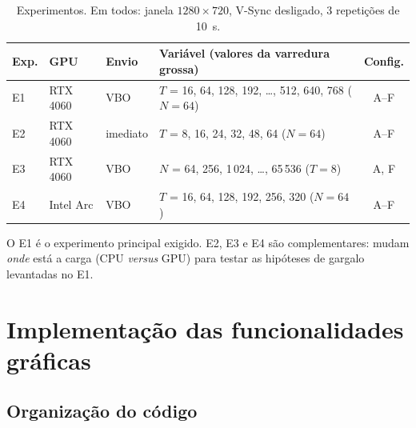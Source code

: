 \documentclass[12pt,a4paper]{article}
\begin{document}
\begin{table}[H]
\centering
\caption{Experimentos. Em todos: janela $1280\times720$, V-Sync desligado, 3 repetições de 10~s.}
\label{tab:experimentos}
\small
\begin{tabularx}{\textwidth}{l l l L c}
\toprule
Exp. & GPU & Envio & Variável (valores da varredura grossa) & Config. \\
\midrule
E1 & RTX 4060 & VBO & $T$ = 16, 64, 128, 192, \dots, 512, 640, 768 ($N=64$) & A--F \\
E2 & RTX 4060 & imediato & $T$ = 8, 16, 24, 32, 48, 64 ($N=64$) & A--F \\
E3 & RTX 4060 & VBO & $N$ = 64, 256, 1\,024, \dots, 65\,536 ($T=8$) & A, F \\
E4 & Intel Arc & VBO & $T$ = 16, 64, 128, 192, 256, 320 ($N=64$) & A--F \\
\bottomrule
\end{tabularx}
\end{table}
O E1 é o experimento principal exigido. E2, E3 e E4 são complementares: mudam \emph{onde} está
a carga (CPU \emph{versus} GPU) para testar as hipóteses de gargalo levantadas no E1.

\section{Implementação das funcionalidades gráficas}

\subsection{Organização do código}
\end{document}
